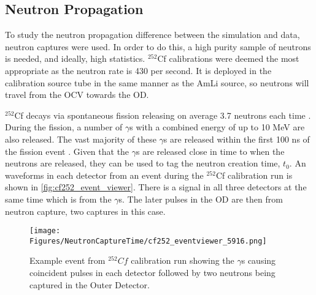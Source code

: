 \subsection{Neutron Propagation}
\par
To study the neutron propagation difference between the simulation and data, neutron captures were used.
In order to do this, a high purity sample of neutrons is needed, and ideally, high statistics.
${}^{252}$Cf calibrations were deemed the most appropriate as the neutron rate is 430 per second.
It is deployed in the calibration source tube in the same manner as the AmLi source, so neutrons will travel from the OCV towards the OD.
\par
${}^{252}$Cf decays via spontaneous fission releasing on average 3.7 neutrons each time \cite{californium252_ref}.
During the fission, a number of $\gamma$s with a combined energy of up to 10 MeV are also released.
The vast majority of these $\gamma$s are released within the first 100 ns of the fission event \cite{cf252_fission_ref,californium_spectra_ref}.
Given that the $\gamma$s are released close in time to when the neutrons are released, they can be used to tag the neutron creation time, $t_0$.
An waveforms in each detector from an event during the ${}^{252}$Cf calibration run is shown in \autoref{fig:cf252_event_viewer}.
There is a signal in all three detectors at the same time which is from the $\gamma$s.
The later pulses in the OD are then from neutron capture, two captures in this case.


\begin{figure}[]
\texttt{[image: Figures/NeutronCaptureTime/cf252\_eventviewer\_5916.png]}
\centering
\caption{Example event from ${}^{252}{Cf}$ calibration run showing the $\gamma$s causing coincident pulses in each detector followed by two neutrons being captured in the Outer Detector.}
\label{fig:cf252_event_viewer}
\end{figure}

